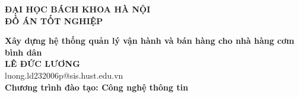 \documentclass[20232006p.tex]{subfiles}
\begin{document}
\begin{titlepage}
\thispagestyle{empty}
\begin{center}

{\textbf{\large{ĐẠI HỌC BÁCH KHOA HÀ NỘI}}}\\[4cm]

{\textbf{\huge{ĐỒ ÁN TỐT NGHIỆP}}}\\[1cm]
{\textbf{\Large{Xây dựng hệ thống quản lý vận hành và bán hàng cho nhà hàng cơm bình dân}}\\[1cm]

{\textbf{\large{LÊ ĐỨC LƯƠNG}}}\\
{\large{luong.ld232006p@sis.hust.edu.vn}}\\[0.5cm]

{\textbf{\large{Chương trình đào tạo: Công nghệ thông tin
}}}\\

\vspace{4cm}
\begin{table}[H]
\centering
{}
\end{table}}
\end{center}



\end{titlepage}
\end{document}
